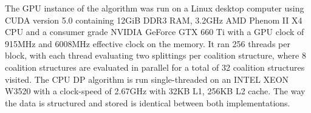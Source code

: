 \documentclass{llncs}
\begin{document}
The GPU instance of the algorithm was run on a Linux desktop computer using CUDA version 5.0 containing 12GiB DDR3 RAM,  3.2GHz AMD Phenom II X4 CPU and a consumer grade NVIDIA GeForce GTX 660 Ti with a GPU clock of 915MHz and 6008MHz effective clock on the memory.
It ran 256 threads per block, with each thread evaluating two splittings per coalition structure, 
where 8 coalition structures are evaluated in parallel for a total of 32 coalition structures visited.
The CPU DP algorithm is run single-threaded on an INTEL XEON W3520 with a clock-speed of 2.67GHz with 32KB L1, 256KB L2 cache.  The way the data is structured and stored is identical between both implementations.

%
\end{document}
